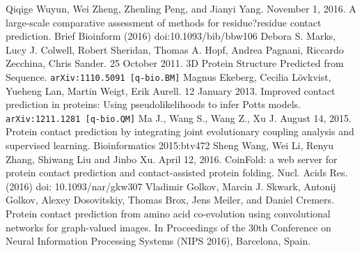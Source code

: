 \documentclass{article}
\begin{document}

\begin{thebibliography}{9}
{\setlength\itemsep{0.0em}
	Qiqige Wuyun, Wei Zheng, Zhenling Peng, and Jianyi Yang. November 1, 2016. A large-scale comparative assessment of methods for residue?residue contact prediction. Brief Bioinform (2016) doi:10.1093/bib/bbw106
	Debora S. Marks, Lucy J. Colwell, Robert Sheridan, Thomas A. Hopf, Andrea Pagnani, Riccardo Zecchina, Chris Sander. 25 October 2011. 3D Protein Structure Predicted from Sequence. {\tt arXiv:1110.5091 [q-bio.BM]}
	Magnus Ekeberg, Cecilia L{\"o}vkvist, Yueheng Lan, Martin Weigt, Erik Aurell. 12 January 2013. Improved contact prediction in proteins: Using pseudolikelihoods to infer Potts models. {\tt arXiv:1211.1281 [q-bio.QM]}
	 Ma J., Wang S., Wang Z., Xu J. August 14, 2015. Protein contact prediction by integrating joint evolutionary coupling analysis and supervised learning. Bioinformatics 2015:btv472
	Sheng Wang,  Wei Li, Renyu Zhang, Shiwang Liu and Jinbo Xu. April 12, 2016. CoinFold: a web server for protein contact prediction and contact-assisted protein folding. Nucl. Acids Res. (2016) doi: 10.1093/nar/gkw307
	Vladimir Golkov, Marcin J. Skwark, Antonij Golkov, Alexey Dosovitskiy, Thomas Brox, Jens Meiler, and Daniel Cremers. Protein contact prediction from amino acid co-evolution using convolutional networks for graph-valued images. In Proceedings of the 30th Conference on Neural Information Processing Systems (NIPS 2016), Barcelona, Spain.
}
\end{thebibliography}
\end{document}
